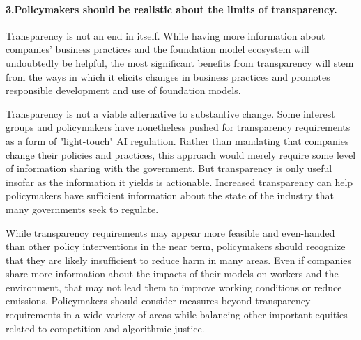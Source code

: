 \documentclass[screen, authorversion, acmsmall]{acmart}
\begin{document}
 \paragraph{3.\phantom{X}Policymakers should be realistic about the limits of transparency.}
\begin{myitemize}
\item Transparency is not an end in itself. 
While having more information about companies' business practices and the foundation model ecosystem will undoubtedly be helpful, the most significant benefits from transparency will stem from the ways in which it elicits changes in business practices and promotes responsible development and use of foundation models.
\item Transparency is not a viable alternative to substantive change.
Some interest groups and policymakers have nonetheless pushed for transparency requirements as a form of "light-touch" AI regulation.
Rather than mandating that companies change their policies and practices, this approach would merely require some level of information sharing with the government.
But transparency is only useful insofar as the information it yields is actionable.
Increased transparency can help policymakers have sufficient information about the state of the industry that many governments seek to regulate.
\item While transparency requirements may appear more feasible and even-handed than other policy interventions in the near term, policymakers should recognize that they are likely insufficient to reduce harm in many areas. 
Even if companies share more information about the impacts of their models on workers and the environment, that may not lead them to improve working conditions or reduce emissions. 
Policymakers should consider measures beyond transparency requirements in a wide variety of areas while balancing other important equities related to competition and algorithmic justice. 
\end{myitemize}
\end{document}
